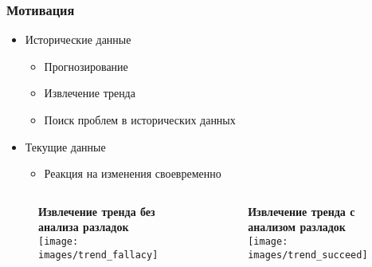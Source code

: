 \documentclass[intlimits, 9pt, unicode]{beamer}
\begin{document}
\begin{frame}
    \frametitle{Мотивация}
    \begin{itemize}
    	\item{Исторические данные}
	    \begin{itemize}
	      \item{Прогнозирование}
	      \item{Извлечение тренда}
	      \item{Поиск проблем в исторических данных}
	    \end{itemize}
    	\item Текущие данные
	    \begin{itemize}
	      \item{Реакция на изменения своевременно}
	    \end{itemize}
    \end{itemize}


   \begin{columns}
        \begin{column}{5cm}
	\begin{figure}
		\textbf{Извлечение тренда без анализа разладок}
		\texttt{[image: images/trend\_fallacy]}
	\end{figure}
        \end{column}

        \begin{column}{5cm}
	\begin{figure}
		\textbf{Извлечение тренда с анализом разладок}
		\texttt{[image: images/trend\_succeed]}
	\end{figure}
        \end{column}
    \end{columns}


\end{frame}
\end{document}
